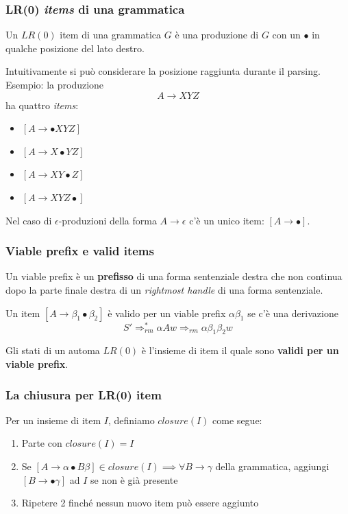 \subsubsection{LR(0) \textit{items} di una grammatica}
\begin{definition}[$LR(0)$ item]
Un $LR(0)$ item di una grammatica $G$ \`e una produzione di $G$ con un $\bullet$
in qualche posizione del lato destro.
\end{definition}

Intuitivamente si pu\`o considerare la posizione raggiunta durante il parsing.
Esempio: la produzione
$$A \to XYZ$$
ha quattro \textit{items}:
\begin{itemize}
\item $[A \to \bullet XYZ]$
\item $[A \to X \bullet YZ]$
\item $[A \to XY \bullet Z]$
\item $[A \to XYZ \bullet]$
\end{itemize}

Nel caso di $\epsilon$-produzioni della forma $A \to \epsilon$ c'\`e un unico
item: $[A \to \bullet]$.

\subsubsection{Viable prefix e valid items}
\label{sec:viable_prefix_and_valid_items}
\begin{definition}
Un viable prefix \`e un \textbf{prefisso} di una forma sentenziale destra che
non continua dopo la parte finale destra di un \textit{rightmost handle} di una
forma sentenziale.
\end{definition}

\begin{definition}
Un item $[A \to \beta_1 \bullet \beta_2]$ \`e valido per un viable prefix
$\alpha\beta_1$ se c'\`e una derivazione
$$S' \Rightarrow^*_{rm} \alpha Aw \Rightarrow_{rm} \alpha\beta_1\beta_2w $$
\end{definition}

Gli stati di un automa $LR(0)$ \`e l'insieme di item il quale sono
\textbf{validi per un viable prefix}.

\subsubsection{La chiusura per LR(0) item}
\begin{definition}
Per un insieme di item $I$, definiamo $closure(I)$ come segue:
\begin{enumerate}
\item Parte con $closure(I) = I$
\item Se $[A \to \alpha\bullet B\beta] \in closure(I) \implies \forall B \to
\gamma$ della grammatica, aggiungi $[B \to \bullet\gamma]$ ad $I$ se non \`e
gi\`a presente
\item Ripetere 2 finch\'e nessun nuovo item pu\`o essere aggiunto
\end{enumerate}
\end{definition}

